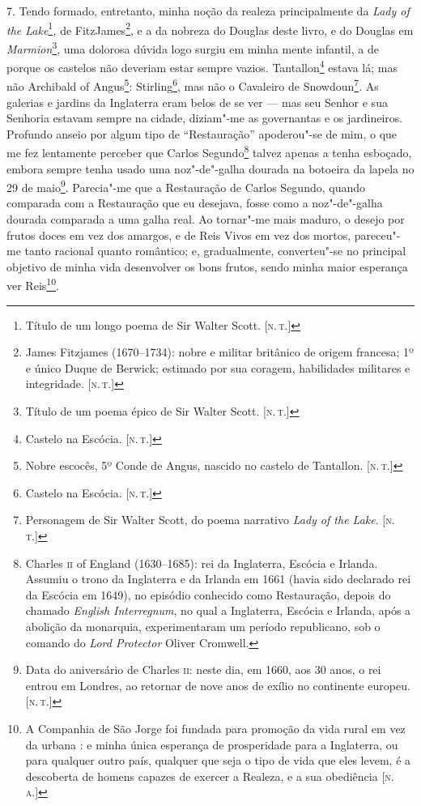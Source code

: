 7. Tendo formado, entretanto, minha noção da realeza principalmente da
\emph{Lady of the Lake}\footnote{Título de um longo poema de Sir Walter
  Scott. {[}\textsc{n.\,t.}{]}}\emph{,} de FitzJames\footnote{James Fitzjames
  (1670--1734): nobre e militar britânico de origem francesa; 1º e único
  Duque de Berwick; estimado por sua coragem, habilidades militares e
  integridade. {[}\textsc{n.\,t.}{]}}, e a da nobreza do Douglas deste livro, e
do Douglas em \emph{Marmion}\footnote{Título de um poema épico de Sir
  Walter Scott. {[}\textsc{n.\,t.}{]}}, uma dolorosa dúvida logo surgiu
em minha mente infantil, a de porque os castelos não deveriam estar
sempre vazios. Tantallon\footnote{Castelo na Escócia. {[}\textsc{n.\,t.}{]}}
estava lá; mas não Archibald of Angus\footnote{Nobre escocês, 5º Conde
  de Angus, nascido no castelo de Tantallon. {[}\textsc{n.\,t.}{]}}:
Stirling\footnote{Castelo na Escócia. {[}\textsc{n.\,t.}{]}}, mas não o
Cavaleiro de Snowdoun\footnote{Personagem de Sir Walter Scott, do poema
  narrativo \emph{Lady of the Lake}. {[}\textsc{n.\,t.}{]}}. As galerias e
jardins da Inglaterra eram belos de se ver --- mas seu Senhor e sua
Senhoria estavam sempre na cidade, diziam"-me as governantas e os
jardineiros. Profundo anseio por algum tipo de ``Restauração''
apoderou"-se de mim, o que me fez lentamente perceber que Carlos
Segundo\footnote{Charles \textsc{ii} of England (1630--1685): rei da Inglaterra,
  Escócia e Irlanda. Assumiu o trono da Inglaterra e da Irlanda em 1661
  (havia sido declarado rei da Escócia em 1649), no episódio conhecido
  como Restauração, depois do chamado \emph{English Interregnum}, no
  qual a Inglaterra, Escócia e Irlanda, após a abolição da monarquia,
  experimentaram um período republicano, sob o comando do \emph{Lord
  Protector} Oliver Cromwell.} talvez apenas a tenha esboçado, embora
sempre tenha usado uma noz"-de"-galha dourada na botoeira da lapela no 29
de maio\footnote{Data do aniversário de Charles \textsc{ii}: neste dia, em 1660,
  aos 30 anos, o rei entrou em Londres, ao retornar de nove anos de
  exílio no continente europeu. {[}\textsc{n.\,t.}{]}}. Parecia"-me que a
Restauração de Carlos Segundo, quando comparada com a Restauração que eu
desejava, fosse como a noz"-de"-galha dourada comparada a uma galha real.
Ao tornar"-me mais maduro, o desejo por frutos doces em vez dos amargos,
e de Reis Vivos em vez dos mortos, pareceu"-me tanto racional quanto
romântico; e, gradualmente, converteu"-se no principal objetivo de minha
vida desenvolver os bons frutos, sendo minha maior esperança ver
Reis\footnote{A Companhia de São Jorge foi fundada para promoção da vida
  rural em vez da urbana : e minha única esperança de prosperidade para
  a Inglaterra, ou para qualquer outro país, qualquer que seja o tipo de
  vida que eles levem, é a descoberta de homens capazes de exercer a
  Realeza, e a sua obediência {[}\textsc{n.\,a.}{]}}.


